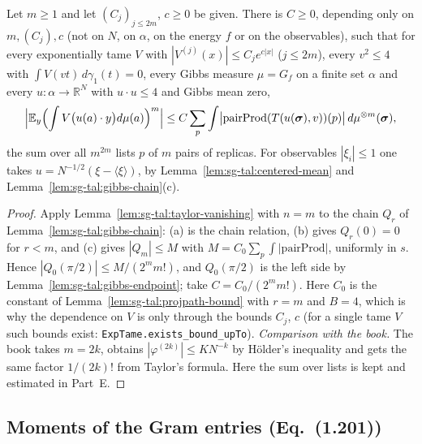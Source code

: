 \begin{theorem}
\label{thm:sg-tal:gibbs-taylor}
  \leanok
{}
Let $m\ge1$ and let $(C_j)_{j\le2m}$, $c\ge0$ be given.  There is $C\ge0$, depending only on $m,(C_j),c$ (not on $N$, on $\alpha$, on the energy $f$ or on the observables), such that for every exponentially tame $V$ with $|V^{(j)}(x)|\le C_je^{c|x|}$ ($j\le2m$), every $v^2\le4$ with $\int V(vt)\,d\gamma_1(t)=0$, every Gibbs measure $\mu=G_f$ on a finite set $\alpha$ and every $u:\alpha\to\mathbb R^N$ with $u\cdot u\le4$ and Gibbs mean zero,
\[
\Bigl|\mathbb E_y\Bigl(\int V\bigl(u(a)\cdot y\bigr)d\mu(a)\Bigr)^m\Bigr|\le C\sum_{p}\int\bigl|\mathrm{pairProd}(T(u(\boldsymbol\sigma),v))(p)\bigr|\,d\mu^{\otimes m}(\boldsymbol\sigma),
\]
the sum over all $m^{2m}$ lists $p$ of $m$ pairs of replicas.  For observables $|\xi_i|\le1$ one takes $u=N^{-1/2}(\xi-\langle\xi\rangle)$, by Lemma~\ref{lem:sg-tal:centered-mean} and Lemma~\ref{lem:sg-tal:gibbs-chain}(c).
\end{theorem}
\begin{proof}
  \leanok
Apply Lemma~\ref{lem:sg-tal:taylor-vanishing} with $n=m$ to the chain $Q_r$ of Lemma~\ref{lem:sg-tal:gibbs-chain}: (a) is the chain relation, (b) gives $Q_r(0)=0$ for $r<m$, and (c) gives $|Q_m|\le M$ with
$M=C_0\sum_p\int|\mathrm{pairProd}|$, uniformly in $s$.  Hence $|Q_0(\pi/2)|\le M/(2^mm!)$, and $Q_0(\pi/2)$ is the left side by Lemma~\ref{lem:sg-tal:gibbs-endpoint}; take $C=C_0/(2^mm!)$.  Here $C_0$ is the constant of Lemma~\ref{lem:sg-tal:projpath-bound} with $r=m$ and $B=4$, which is why the dependence on $V$ is only through the bounds $C_j$, $c$ (for a single tame $V$ such bounds exist: \texttt{ExpTame.exists\_bound\_upTo}).
\emph{Comparison with the book.}  The book takes $m=2k$, obtains $|\varphi^{(2k)}|\le KN^{-k}$ by H\"older's inequality and gets the same factor $1/(2k)!$ from Taylor's formula.
Here the sum over lists is kept and estimated in Part~E.
\end{proof}

\subsection{Moments of the Gram entries (Eq.~(1.201))}
\label{sec:sg-tal:fluct-gram}

